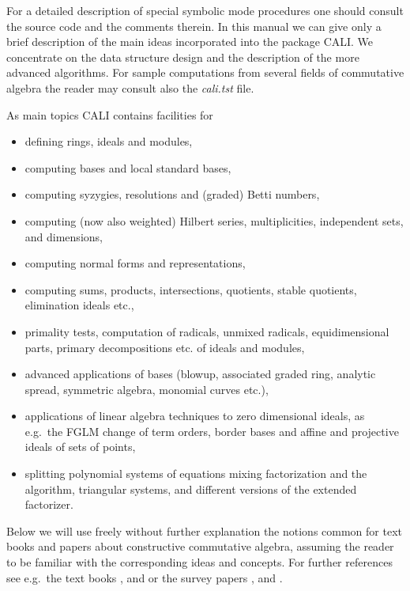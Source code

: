 For a detailed description of special symbolic mode procedures one
should consult the source code and the comments therein. In this
manual we can give only a brief description of the main ideas
incorporated into the package CALI. We concentrate on the data
structure design and the description of the more advanced algorithms.
For sample computations from several fields of commutative algebra
the reader may consult also the {\em cali.tst} file.
\medskip

As main topics CALI contains facilities for
\begin{itemize}
\item defining rings, ideals and modules,

\item computing \gr bases and local standard bases,

\item computing syzygies, resolutions and (graded) Betti numbers,

\item computing (now also weighted) Hilbert series, multiplicities,
independent sets, and dimensions,

\item computing normal forms and representations,

\item computing sums, products, intersections, quotients, stable
quotients, elimination ideals etc.,

\item primality tests, computation of radicals, unmixed radicals,
equidimensional parts, primary decompositions etc. of ideals and
modules,

\item advanced applications of \gr bases (blowup, associated graded
ring, analytic spread, symmetric algebra, monomial curves etc.),

\item applications of linear algebra techniques to zero dimensional
	ideals, as e.g.\ the FGLM change of term orders, border bases
	and affine and projective ideals of sets of points,

\item splitting polynomial systems of equations mixing factorization and
the \gr algorithm, triangular systems, and different versions of the
extended \gr factorizer. 

\end{itemize}

Below we will use freely without further explanation the notions
common for text books and papers about constructive commutative
algebra, assuming the reader to be familiar with the corresponding
ideas and concepts. For further references see e.g.\ the text books
\cite{BKW}, \cite{CLO} and \cite{Mishra} or the survey papers
\cite{B1}, \cite{B2} and \cite{Ro}. 

